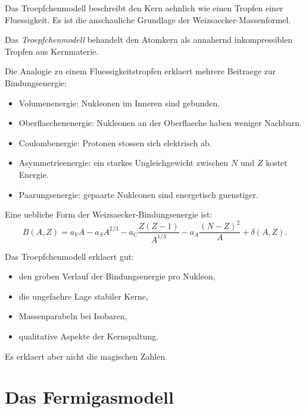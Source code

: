 Das Troepfchenmodell beschreibt den Kern aehnlich wie einen Tropfen einer Fluessigkeit.
Es ist die anschauliche Grundlage der Weizsaecker-Massenformel.

\begin{definitionbox}
Das \emph{Troepfchenmodell} behandelt den Atomkern als annahernd inkompressiblen
Tropfen aus Kernmaterie.
\end{definitionbox}

\begin{conceptbox}
Die Analogie zu einem Fluessigkeitstropfen erklaert mehrere Beitraege zur
Bindungsenergie:
\begin{itemize}
    \item Volumenenergie: Nukleonen im Inneren sind gebunden.
    \item Oberflaechenenergie: Nukleonen an der Oberflaeche haben weniger Nachbarn.
    \item Coulombenergie: Protonen stossen sich elektrisch ab.
    \item Asymmetrieenergie: ein starkes Ungleichgewicht zwischen $N$ und $Z$ kostet Energie.
    \item Paarungsenergie: gepaarte Nukleonen sind energetisch guenstiger.
\end{itemize}
\end{conceptbox}

\begin{formulabox}
Eine uebliche Form der Weizsaecker-Bindungsenergie ist:
\begin{equation*}
    B(A,Z)
    =
    a_V A
    - a_S A^{2/3}
    - a_C \frac{Z(Z-1)}{A^{1/3}}
    - a_A \frac{(N-Z)^2}{A}
    + \delta(A,Z).
\end{equation*}
\end{formulabox}

\begin{notebox}
Das Troepfchenmodell erklaert gut:
\begin{itemize}
    \item den groben Verlauf der Bindungsenergie pro Nukleon,
    \item die ungefaehre Lage stabiler Kerne,
    \item Massenparabeln bei Isobaren,
    \item qualitative Aspekte der Kernspaltung.
\end{itemize}

Es erklaert aber nicht die magischen Zahlen.
\end{notebox}

\section{Das Fermigasmodell}

